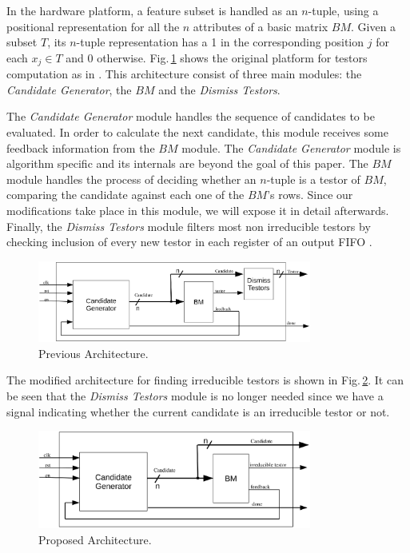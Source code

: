 \documentclass[conference]{IEEEtran}
\begin{document}
In the hardware platform, a feature subset is handled as an $n$-tuple, using a positional 
representation for all the $n$ attributes of a basic matrix $BM$. Given a subset $T$, its $n$-tuple 
representation has a 1 in the corresponding position $j$ for each $x_j \in T$ and 0 otherwise.
Fig.\,\ref{figOldArq} shows the original platform for testors computation as in \cite{Rojas12}. This 
architecture consist of three main modules: the \textit{Candidate Generator}, the $BM$ and the 
\textit{Dismiss Testors}.

The \textit{Candidate Generator} module handles the sequence of candidates to be evaluated. In order to 
calculate the next candidate, this module receives some feedback information from the $BM$ module. The 
\textit{Candidate Generator} module is algorithm specific and its internals are beyond the goal of this paper.
The $BM$ module handles the process of deciding whether an $n$-tuple is a testor of $BM$,
comparing the candidate against each one of the $BM$'s rows. Since our modifications take place in this 
module, we will expose it in detail afterwards. Finally, the \textit{Dismiss Testors} module filters most 
non irreducible testors by checking inclusion of every new testor in each register of an output FIFO \cite{Rojas12}.

\begin{figure}[htb]
    \centering
    \includegraphics[width=9cm]{old_arq.eps}
	\caption{Previous Architecture.}
	\label{figOldArq}
\end{figure}

The modified architecture for finding irreducible testors is shown in Fig.\,\ref{figNewArq}. It can be seen 
that the \textit{Dismiss Testors} module is no longer needed since we have a signal indicating whether the 
current candidate is an irreducible testor or not. 

\begin{figure}[htb]
    \centering
    \includegraphics[width=9cm]{new_arq.eps}
	\caption{Proposed Architecture.}
	\label{figNewArq}
\end{figure}
\end{document}
